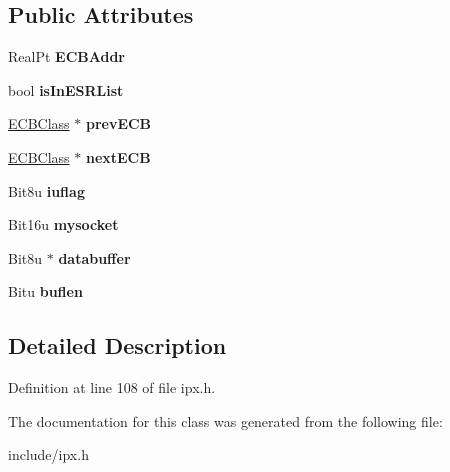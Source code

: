 \subsection*{Public Attributes}
\begin{DoxyCompactItemize}
\item 
\hypertarget{classECBClass_a70385dccbb3fd048601274c64460679f}{Real\-Pt {\bfseries E\-C\-B\-Addr}}\label{classECBClass_a70385dccbb3fd048601274c64460679f}

\item 
\hypertarget{classECBClass_a950f8206fccc04b8039bb3217247a7a5}{bool {\bfseries is\-In\-E\-S\-R\-List}}\label{classECBClass_a950f8206fccc04b8039bb3217247a7a5}

\item 
\hypertarget{classECBClass_ac6cb3c4097f80da79902c7ba547a5cc2}{\hyperlink{classECBClass}{E\-C\-B\-Class} $\ast$ {\bfseries prev\-E\-C\-B}}\label{classECBClass_ac6cb3c4097f80da79902c7ba547a5cc2}

\item 
\hypertarget{classECBClass_ae3c90d3d2805e94acffec8c13aeb499b}{\hyperlink{classECBClass}{E\-C\-B\-Class} $\ast$ {\bfseries next\-E\-C\-B}}\label{classECBClass_ae3c90d3d2805e94acffec8c13aeb499b}

\item 
\hypertarget{classECBClass_ab91358cad096e429d36698b319e33729}{Bit8u {\bfseries iuflag}}\label{classECBClass_ab91358cad096e429d36698b319e33729}

\item 
\hypertarget{classECBClass_aecebb3e5370ea301b175672b75355c4b}{Bit16u {\bfseries mysocket}}\label{classECBClass_aecebb3e5370ea301b175672b75355c4b}

\item 
\hypertarget{classECBClass_a0545910c02ae80af6944a3eca0411446}{Bit8u $\ast$ {\bfseries databuffer}}\label{classECBClass_a0545910c02ae80af6944a3eca0411446}

\item 
\hypertarget{classECBClass_ab77c3b64dce1be8a8a9b7332122322c9}{Bitu {\bfseries buflen}}\label{classECBClass_ab77c3b64dce1be8a8a9b7332122322c9}

\end{DoxyCompactItemize}


\subsection{Detailed Description}


Definition at line 108 of file ipx.\-h.



The documentation for this class was generated from the following file\-:\begin{DoxyCompactItemize}
\item 
include/ipx.\-h\end{DoxyCompactItemize}
